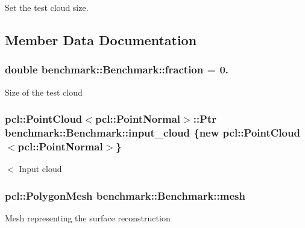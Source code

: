 Set the test cloud size. 



\subsection{Member Data Documentation}
\subsubsection[{\texorpdfstring{fraction}{fraction}}]{\setlength{\rightskip}{0pt plus 5cm}double benchmark\+::\+Benchmark\+::fraction = 0.\hspace{0.3cm}{\ttfamily [private]}}\hypertarget{classbenchmark_1_1_benchmark_ac05259c7c78e7f7fd12c8c573e96871e}{}\label{classbenchmark_1_1_benchmark_ac05259c7c78e7f7fd12c8c573e96871e}
Size of the test cloud 
\subsubsection[{\texorpdfstring{input\+\_\+cloud}{input_cloud}}]{\setlength{\rightskip}{0pt plus 5cm}pcl\+::\+Point\+Cloud$<$pcl\+::\+Point\+Normal$>$\+::Ptr benchmark\+::\+Benchmark\+::input\+\_\+cloud \{new pcl\+::\+Point\+Cloud$<$pcl\+::\+Point\+Normal$>$\}\hspace{0.3cm}{\ttfamily [private]}}\hypertarget{classbenchmark_1_1_benchmark_a472d2ad851caafd323436e779ae68e56}{}\label{classbenchmark_1_1_benchmark_a472d2ad851caafd323436e779ae68e56}
$<$ Input cloud 
\subsubsection[{\texorpdfstring{mesh}{mesh}}]{\setlength{\rightskip}{0pt plus 5cm}pcl\+::\+Polygon\+Mesh benchmark\+::\+Benchmark\+::mesh\hspace{0.3cm}{\ttfamily [private]}}\hypertarget{classbenchmark_1_1_benchmark_ac909ac5421efc317d13cccbe8049879d}{}\label{classbenchmark_1_1_benchmark_ac909ac5421efc317d13cccbe8049879d}
Mesh representing the surface reconstruction 
